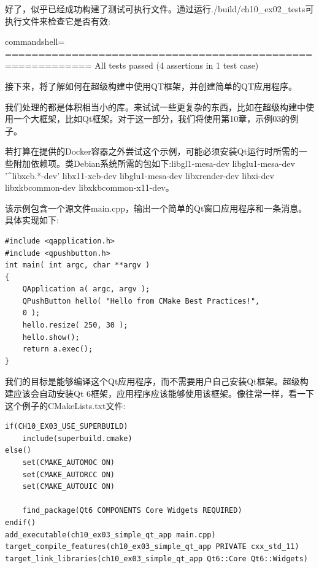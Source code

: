 好了，似乎已经成功构建了测试可执行文件。通过运行./build/ch10\_ex02\_tests可执行文件来检查它是否有效:

\begin{tcblisting}{commandshell={}}
===========================================================
All tests passed (4 assertions in 1 test case)
\end{tcblisting}

接下来，将了解如何在超级构建中使用QT框架，并创建简单的QT应用程序。


我们处理的都是体积相当小的库。来试试一些更复杂的东西，比如在超级构建中使用一个大框架，比如Qt框架。对于这一部分，我们将使用第10章，示例03的例子。

\begin{tcolorbox}[colback=blue!5!white,colframe=blue!75!black,title=重要note]
若打算在提供的Docker容器之外尝试这个示例，可能必须安装Qt运行时所需的一些附加依赖项。类Debian系统所需的包如下:libgl1-mesa-dev libglu1-mesa-dev '\^{}libxcb.*-dev' libx11-xcb-dev libglu1-mesa-dev libxrender-dev libxi-dev libxkbcommon-dev libxkbcommon-x11-dev。
\end{tcolorbox}

该示例包含一个源文件main.cpp，输出一个简单的Qt窗口应用程序和一条消息。具体实现如下:

\begin{lstlisting}[style=styleCXX]
#include <qapplication.h>
#include <qpushbutton.h>
int main( int argc, char **argv )
{
	QApplication a( argc, argv );
	QPushButton hello( "Hello from CMake Best Practices!",
	0 );
	hello.resize( 250, 30 );
	hello.show();
	return a.exec();
}
\end{lstlisting}

我们的目标是能够编译这个Qt应用程序，而不需要用户自己安装Qt框架。超级构建应该会自动安装Qt 6框架，应用程序应该能够使用该框架。像往常一样，看一下这个例子的CMakeLists.txt文件:

\begin{lstlisting}[style=styleCMake]
if(CH10_EX03_USE_SUPERBUILD)
	include(superbuild.cmake)
else()
	set(CMAKE_AUTOMOC ON)
	set(CMAKE_AUTORCC ON)
	set(CMAKE_AUTOUIC ON)

	find_package(Qt6 COMPONENTS Core Widgets REQUIRED)
endif()
add_executable(ch10_ex03_simple_qt_app main.cpp)
target_compile_features(ch10_ex03_simple_qt_app PRIVATE cxx_std_11)
target_link_libraries(ch10_ex03_simple_qt_app Qt6::Core Qt6::Widgets)
\end{lstlisting}

